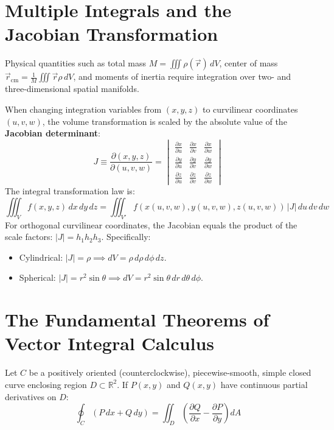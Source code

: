 \section{Multiple Integrals and the Jacobian Transformation}
Physical quantities such as total mass $M = \iiint \rho(\vec{r})\,dV$, center of mass $\vec{r}_{\text{cm}} = \frac{1}{M}\iiint \vec{r}\rho\,dV$, and moments of inertia require integration over two- and three-dimensional spatial manifolds.

When changing integration variables from $(x, y, z)$ to curvilinear coordinates $(u, v, w)$, the volume transformation is scaled by the absolute value of the \textbf{Jacobian determinant}:
\begin{equation}
J \equiv \frac{\partial(x, y, z)}{\partial(u, v, w)} = \begin{vmatrix} \frac{\partial x}{\partial u} & \frac{\partial x}{\partial v} & \frac{\partial x}{\partial w} \\ \frac{\partial y}{\partial u} & \frac{\partial y}{\partial v} & \frac{\partial y}{\partial w} \\ \frac{\partial z}{\partial u} & \frac{\partial z}{\partial v} & \frac{\partial z}{\partial w} \end{vmatrix}
\end{equation}
The integral transformation law is:
\begin{equation}
\iiint_V f(x, y, z)\,dx\,dy\,dz = \iiint_{V'} f(x(u,v,w), y(u,v,w), z(u,v,w))\,|J|\,du\,dv\,dw
\end{equation}
For orthogonal curvilinear coordinates, the Jacobian equals the product of the scale factors: $|J| = h_1 h_2 h_3$. Specifically:
\begin{itemize}
    \item Cylindrical: $|J| = \rho \implies dV = \rho\,d\rho\,d\phi\,dz$.
    \item Spherical: $|J| = r^2\sin\theta \implies dV = r^2\sin\theta\,dr\,d\theta\,d\phi$.
\end{itemize}

\section{The Fundamental Theorems of Vector Integral Calculus}

\begin{maththeorem}
Let $C$ be a positively oriented (counterclockwise), piecewise-smooth, simple closed curve enclosing region $D \subset \mathbb{R}^2$. If $P(x, y)$ and $Q(x, y)$ have continuous partial derivatives on $D$:
\begin{equation}
\oint_C (P\,dx + Q\,dy) = \iint_D \left(\frac{\partial Q}{\partial x} - \frac{\partial P}{\partial y}\right)dA
\end{equation}
\end{maththeorem}

